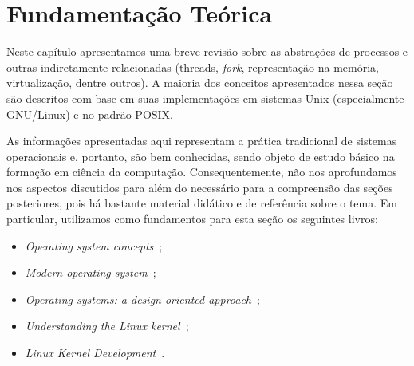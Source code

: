 \chapter{Fundamentação Teórica}
\label{cap:fundamentacao}

Neste capítulo apresentamos uma breve revisão sobre as  abstrações de
processos e outras indiretamente relacionadas (threads, \emph{fork},
representação na memória, virtualização, dentre outros). 
A maioria dos conceitos apresentados nessa seção são descritos com base em suas implementações em sistemas
Unix (especialmente GNU/Linux) e no padrão POSIX.

As informações apresentadas aqui representam a prática tradicional de sistemas
operacionais e, portanto, são bem conhecidas, sendo objeto de estudo básico na
formação em ciência da computação. Consequentemente, não nos aprofundamos nos
aspectos discutidos para além do necessário para a compreensão das seções
posteriores, pois há bastante material didático e de referência sobre o tema.
Em particular, utilizamos como fundamentos para esta seção os seguintes livros:

\begin{itemize}
  \item \textit{Operating system concepts}~\citep{silberschatz};
  \item \textit{Modern operating system}~\citep{tanenbaum};
  \item \textit{Operating systems: a design-oriented approach}~\citep{crowley};
  \item \textit{Understanding the Linux kernel}~\citep{entendendo_kernel};
  \item \textit{Linux Kernel Development}~\citep{love}.
\end{itemize}

